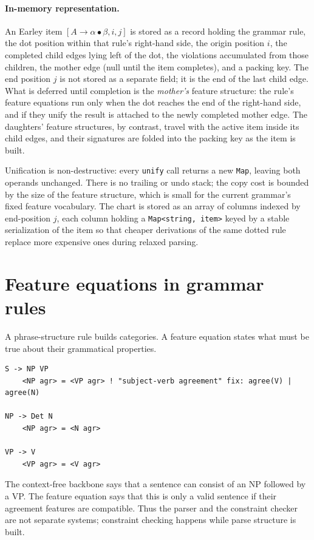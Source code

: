 \documentclass[11pt]{article}
\theoremstyle{definition}
\theoremstyle{plain}
\theoremstyle{remark}
\begin{document}
\paragraph{In-memory representation.}
An Earley item $[A \to \alpha \bullet \beta, i, j]$ is stored as a record holding the
grammar rule, the dot position within that rule's right-hand side, the origin position
$i$, the completed child edges lying left of the dot, the violations accumulated from
those children, the mother edge (null until the item completes), and a packing key. The
end position $j$ is not stored as a separate field; it is the end of the last child edge.
What is deferred until completion is the \emph{mother's} feature structure: the rule's
feature equations run only when the dot reaches the end of the right-hand side, and if
they unify the result is attached to the newly completed mother edge. The daughters'
feature structures, by contrast, travel with the active item inside its child edges, and
their signatures are folded into the packing key as the item is built.

Unification is non-destructive: every \texttt{unify} call returns a new
\texttt{Map}, leaving both operands unchanged. There is no trailing or undo stack;
the copy cost is bounded by the size of the feature structure, which is small for
the current grammar's fixed feature vocabulary. The chart is stored as an array of
columns indexed by end-position $j$, each column holding a \texttt{Map<string, item>}
keyed by a stable serialization of the item so that cheaper derivations of the same
dotted rule replace more expensive ones during relaxed parsing.

\section{Feature equations in grammar rules}

A phrase-structure rule builds categories. A feature equation states what must be true about
their grammatical properties.

\begin{lstlisting}[language=gram]
S -> NP VP
    <NP agr> = <VP agr> ! "subject-verb agreement" fix: agree(V) | agree(N)

NP -> Det N
    <NP agr> = <N agr>

VP -> V
    <VP agr> = <V agr>
\end{lstlisting}

The context-free backbone says that a sentence can consist of an NP followed by a VP. The
feature equation says that this is only a valid sentence if their agreement features are
compatible. Thus the parser and the constraint checker are not separate systems; constraint
checking happens while parse structure is built.
\end{document}

